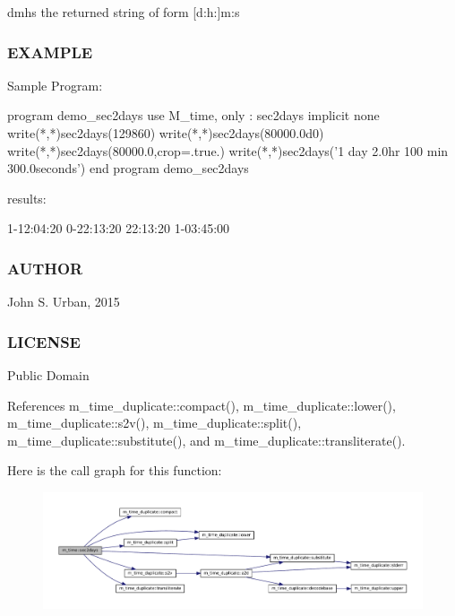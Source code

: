 dmhs the returned string of form \mbox{[}d\+:h\+:\mbox{]}m\+:s

\subsubsection*{E\+X\+A\+M\+P\+LE}

\begin{DoxyVerb}Sample Program:

 program demo_sec2days
 use M_time, only : sec2days
 implicit none
    write(*,*)sec2days(129860)
    write(*,*)sec2days(80000.0d0)
    write(*,*)sec2days(80000.0,crop=.true.)
    write(*,*)sec2days('1 day 2.0hr 100 min 300.0seconds')
 end program demo_sec2days

results:

 1-12:04:20
 0-22:13:20
 22:13:20
 1-03:45:00
\end{DoxyVerb}


\subsubsection*{A\+U\+T\+H\+OR}

John S. Urban, 2015 \subsubsection*{L\+I\+C\+E\+N\+SE}

Public Domain 

References m\+\_\+time\+\_\+duplicate\+::compact(), m\+\_\+time\+\_\+duplicate\+::lower(), m\+\_\+time\+\_\+duplicate\+::s2v(), m\+\_\+time\+\_\+duplicate\+::split(), m\+\_\+time\+\_\+duplicate\+::substitute(), and m\+\_\+time\+\_\+duplicate\+::transliterate().

Here is the call graph for this function\+:\nopagebreak
\begin{figure}[H]
\begin{center}
\leavevmode
\includegraphics[width=350pt]{namespacem__time_a7788285d79b8d58323b05e9a30a2d992_cgraph}
\end{center}
\end{figure}
\mbox{\label{namespacem__time_a7c5d028ae1e1e01162ffc7bb55dcbbb1}} 
